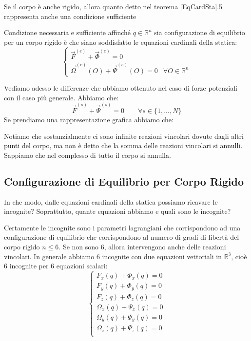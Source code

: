 \documentclass[11pt,a4paper,twoside]{article}
\theoremstyle{definition}
\begin{document}
Se il corpo è anche rigido, allora quanto detto nel teorema \ref{EqCardSta}.5 rappresenta anche una condizione sufficiente

\begin{prop}{}{}
	Condizione necessaria e sufficiente affinché $q\in \mathbb R^n$ sia configurazione di equilibrio per un corpo rigido è che siano soddisfatto le equazioni cardinali della statica:
	\[ \begin{cases}
		\vec F^{(e)} + \vec \Phi^{(e)} = 0\\
		\vec \Omega ^{(e)}(O) + \vec \Psi^{(e)}(O) = 0 & \forall O \in \mathbb R^n
	\end{cases}\]
\end{prop}

Vediamo adesso le differenze che abbiamo ottenuto nel caso di forze potenziali con il caso più generale. Abbiamo che:
\[ \vec F^{(s)} + \vec \Psi^{(s)} = 0\qquad \forall s \in \{1,...,N\} \]
Se prendiamo una rappresentazione grafica abbiamo che:
\begin{center}
\end{center}
Notiamo che sostanzialmente ci sono infinite reazioni vincolari dovute dagli altri punti del corpo, ma non è detto che la somma delle reazioni vincolari si annulli. Sappiamo che nel complesso di tutto il corpo si annulla.

\subsection{Configurazione di Equilibrio per Corpo Rigido}
In che modo, dalle equazioni cardinali della statica possiamo ricavare le incognite? Soprattutto, quante equazioni abbiamo e quali sono le incognite?

Certamente le incognite sono i parametri lagrangiani che corrispondono ad una configurazione di equilibrio che corrispondono al numero di gradi di libertà del corpo rigido $n \leq 6$. Se non sono $6$, allora intervengono anche delle reazioni vincolari. In generale abbiamo $6$ incognite con due equazioni vettoriali in $\mathbb R^3$, cioè $6$ incognite per $6$ equazioni scalari:
\[ \begin{cases}
	F_x(q) + \Phi_x(q) = 0\\
	F_y(q) + \Phi_y(q) = 0\\
	F_z(q) + \Phi_z(q) = 0\\
	\Omega_x(q) + \Psi_x(q) = 0\\
	\Omega_y(q) + \Psi_y(q) = 0\\
	\Omega_z(q) + \Psi_z(q) = 0\\
\end{cases} \]
\end{document}
